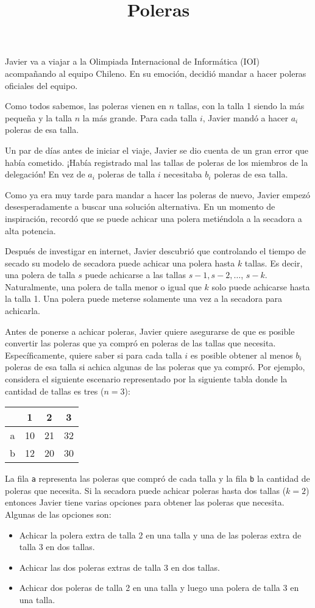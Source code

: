 \documentclass{oci}
\title{Poleras}
\begin{document}
\begin{problemDescription}
Javier va a viajar a la Olimpiada Internacional de Informática (IOI)
acompañando al equipo Chileno.
En su emoción, decidió mandar a hacer poleras oficiales del equipo.

Como todos sabemos, las poleras vienen en $n$ tallas, con la talla 1 siendo la más pequeña
y la talla $n$ la más grande.
Para cada talla $i$, Javier mandó a hacer $a_i$ poleras de esa talla.

Un par de días antes de iniciar el viaje, Javier se dio
cuenta de un gran error que había cometido.
¡Había registrado mal las tallas de poleras de los miembros de la delegación!
En vez de $a_i$ poleras de talla $i$ necesitaba $b_i$ poleras de esa talla.

Como ya era muy tarde para mandar a hacer las poleras de nuevo, Javier
empezó desesperadamente a buscar una solución alternativa.
En un momento de inspiración, recordó que se puede achicar una polera metiéndola a
la secadora a alta potencia.

Después de investigar en internet, Javier descubrió que controlando el tiempo de secado su
modelo de secadora puede achicar una polera hasta $k$ tallas.
Es decir, una polera de talla $s$ puede achicarse a las tallas $s-1, s-2, \dots$, $s-k$.
Naturalmente, una polera de talla menor o igual que $k$ solo puede achicarse hasta la talla 1.
Una polera puede meterse solamente una vez a la secadora para achicarla.

Antes de ponerse a achicar poleras, Javier quiere asegurarse de que es
posible convertir las poleras que ya compró en poleras de
las tallas que necesita.
Específicamente, quiere saber si para cada talla $i$ es posible obtener
al menos $b_i$ poleras de esa talla si achica algunas de las poleras que ya compró.
Por ejemplo, considera el siguiente escenario representado por la siguiente tabla donde la cantidad
de tallas es tres ($n=3$):
\begin{center}
\begin{tabular}{cccc}
   & \footnotesize 1 & \footnotesize2  &  \footnotesize 3 \\
\hline
 a & 10 & 21 & 32 \\
 b & 12 & 20 & 30 \\
\hline
\end{tabular}
\end{center}
La fila \texttt{a} representa las poleras que compró de cada talla y la fila \texttt{b}
la cantidad de poleras que necesita. Si la secadora puede achicar poleras
hasta dos tallas ($k=2$) entonces Javier tiene varias opciones para obtener las poleras
que necesita. Algunas de las opciones son:
\begin{itemize}
    \item Achicar la polera extra de talla 2 en una talla y una de las poleras extra de talla
        3 en dos tallas.
    \item Achicar las dos poleras extras de talla 3 en dos tallas.
    \item Achicar dos poleras de talla 2 en una talla y luego una polera de talla 3 en una talla.
\end{itemize}


\end{problemDescription}
\end{document}

